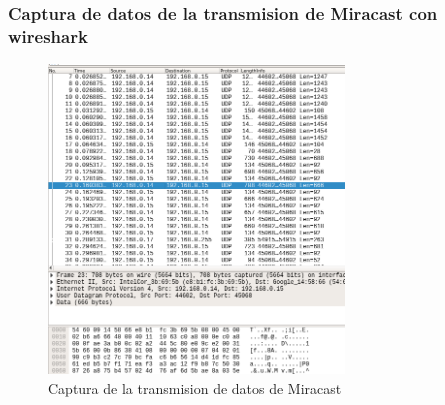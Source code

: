 \begin{frame}
  \frametitle{Captura de datos de la transmision de Miracast con wireshark}
  \begin{figure}
    \centering
    \includegraphics[width=0.7\textwidth]{./Imagenes/wiresarkMiracast.png}
    \caption{Captura de la transmision de datos de Miracast}
  \end{figure}
\end{frame}
